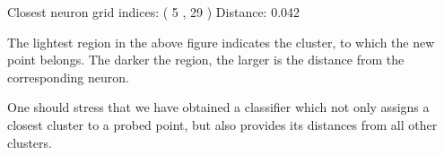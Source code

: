 \documentclass[a4paper,12pt,polish]{jupyterBook}
\begin{document}
\begin{sphinxVerbatimOutput}

\begin{sphinxVerbatim}[commandchars=\\\{\}]
Closest neuron grid indices: ( 5 , 29 )
Distance:  0.042
\end{sphinxVerbatim}
\end{sphinxVerbatimOutput}
\begin{sphinxVerbatimOutput}

\noindent{}
\end{sphinxVerbatimOutput}

\sphinxAtStartPar
The lightest region in the above figure indicates the cluster, to which the new point belongs. The darker the region, the larger is the distance from the corresponding neuron.

\sphinxAtStartPar
One should stress that we have obtained a classifier which not only assigns a closest cluster to a probed point, but also provides its distances from all other clusters.
\end{document}
